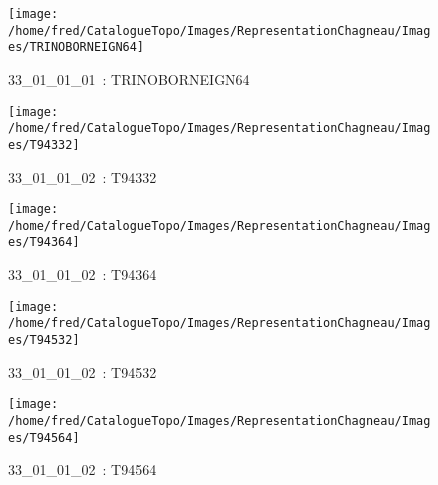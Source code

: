 \documentclass[12pt,titlepage,oneside]{book}
\begin{document}
\begin{figure}[h!]
\begin{minipage}[t]{3cm}
\begin{center}
    \end{center}
  \end{minipage}
  \begin{minipage}[t]{3cm}
    \begin{center}
      \texttt{[image: /home/fred/CatalogueTopo/Images/RepresentationChagneau/Images/TRINOBORNEIGN64]}
      \caption[~33\_01\_01\_01]{\small{33\_01\_01\_01~:} \tiny{TRINOBORNEIGN64}}\label{TRINOBORNEIGN64}
    \end{center}
  \end{minipage}
  \begin{minipage}[t]{3cm}
    \begin{center}
      \texttt{[image: /home/fred/CatalogueTopo/Images/RepresentationChagneau/Images/T94332]}
      \caption[~33\_01\_01\_02]{\small{33\_01\_01\_02~:} \tiny{T94332}}\label{T94332}
    \end{center}
  \end{minipage}
  \begin{minipage}[t]{3cm}
    \begin{center}
      \texttt{[image: /home/fred/CatalogueTopo/Images/RepresentationChagneau/Images/T94364]}
      \caption[~33\_01\_01\_02]{\small{33\_01\_01\_02~:} \tiny{T94364}}\label{T94364}
    \end{center}
  \end{minipage}
  \begin{minipage}[t]{3cm}
    \begin{center}
      \texttt{[image: /home/fred/CatalogueTopo/Images/RepresentationChagneau/Images/T94532]}
      \caption[~33\_01\_01\_02]{\small{33\_01\_01\_02~:} \tiny{T94532}}\label{T94532}
    \end{center}
  \end{minipage}
  \begin{minipage}[t]{3cm}
    \begin{center}
      \texttt{[image: /home/fred/CatalogueTopo/Images/RepresentationChagneau/Images/T94564]}
      \caption[~33\_01\_01\_02]{\small{33\_01\_01\_02~:} \tiny{T94564}}\label{T94564}
    \end{center}
  \end{minipage}
\end{figure}
\end{document}
